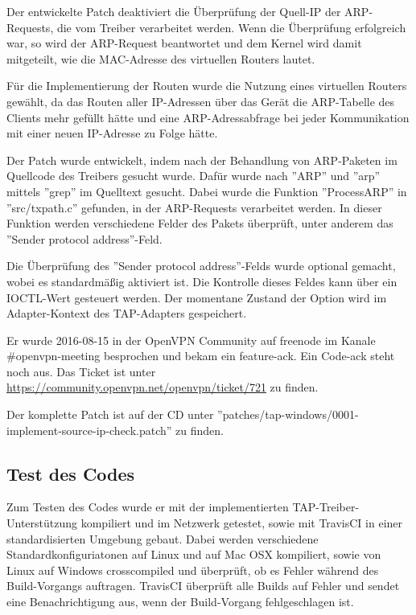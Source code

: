 {Der entwickelte Patch deaktiviert die Überprüfung der Quell-IP der \ac{ARP}-Requests, die
vom Treiber verarbeitet werden. Wenn die Überprüfung erfolgreich war, so wird der ARP-Request
beantwortet und dem Kernel wird damit mitgeteilt, wie die MAC-Adresse des virtuellen Routers lautet.

Für die Implementierung der Routen wurde die Nutzung eines virtuellen Routers gewählt,
da das Routen aller \ac{IP}-Adressen über das Gerät die \ac{ARP}-Tabelle des Clients
mehr gefüllt hätte und eine \ac{ARP}-Adressabfrage bei jeder Kommunikation mit einer neuen
\ac{IP}-Adresse zu Folge hätte.

Der Patch wurde entwickelt, indem nach der Behandlung von \ac{ARP}-Paketen im
Quellcode des Treibers gesucht wurde. Dafür wurde nach ''ARP'' und ''arp'' mittels
''grep'' im Quelltext gesucht. Dabei wurde die Funktion ''ProcessARP'' in ''src/txpath.c''
gefunden, in der \ac{ARP}-Requests verarbeitet werden. In dieser Funktion
werden verschiedene Felder des Pakets überprüft, unter anderem das ''Sender protocol address''-Feld.

Die Überprüfung des ''Sender protocol address''-Felds wurde optional gemacht, 
wobei es standardmäßig aktiviert ist. Die Kontrolle dieses
Feldes kann über ein IOCTL-Wert gesteuert werden. Der momentane Zustand der Option
wird im Adapter-Kontext des TAP-Adapters gespeichert.

Er wurde 2016-08-15 in der OpenVPN Community auf freenode im Kanale \#openvpn-meeting besprochen
und bekam ein feature-ack. Ein Code-ack steht noch aus. Das Ticket ist unter
\url{https://community.openvpn.net/openvpn/ticket/721} zu finden.

Der komplette Patch ist auf der CD unter 
''patches/tap-windows/0001-implement-source-ip-check.patch'' zu finden.


\subsection{Test des Codes}
Zum Testen des Codes wurde er mit der implementierten TAP-Treiber-Unterstützung
kompiliert und im Netzwerk getestet, sowie mit TravisCI in einer standardisierten
Umgebung gebaut. Dabei werden verschiedene Standardkonfiguriatonen auf Linux und auf Mac OSX
kompiliert, sowie von Linux auf Windows crosscompiled und überprüft, ob es
Fehler während des Build-Vorgangs auftragen. TravisCI überprüft alle Builds
auf Fehler und sendet eine Benachrichtigung aus, wenn der Build-Vorgang fehlgeschlagen ist.

}
